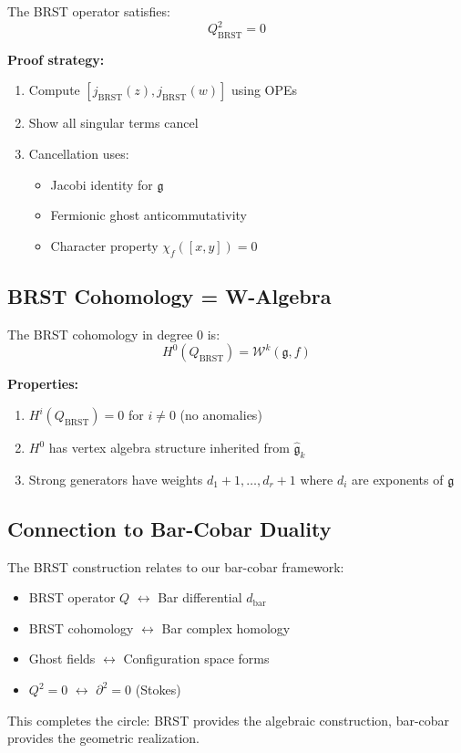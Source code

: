 \begin{theorem}[BRST Nilpotency: $Q^2 = 0$]
\label{thm:brst-nilpotency}
The BRST operator satisfies:
$$Q_{\text{BRST}}^2 = 0$$

\textbf{Proof strategy:}
\begin{enumerate}
\item Compute $[j_{\text{BRST}}(z), j_{\text{BRST}}(w)]$ using OPEs
\item Show all singular terms cancel
\item Cancellation uses:
\begin{itemize}
\item Jacobi identity for $\mathfrak{g}$
\item Fermionic ghost anticommutativity
\item Character property $\chi_f([x,y]) = 0$
\end{itemize}
\end{enumerate}
\end{theorem}

\subsection{BRST Cohomology = W-Algebra}

\begin{theorem}
\label{thm:brst-cohomology}
The BRST cohomology in degree 0 is:
$$H^0(Q_{\text{BRST}}) = \mathcal{W}^k(\mathfrak{g}, f)$$

\textbf{Properties:}
\begin{enumerate}
\item $H^i(Q_{\text{BRST}}) = 0$ for $i \neq 0$ (no anomalies)
\item $H^0$ has vertex algebra structure inherited from $\widehat{\mathfrak{g}}_k$
\item Strong generators have weights $d_1+1, \ldots, d_r+1$ where $d_i$ are 
exponents of $\mathfrak{g}$
\end{enumerate}
\end{theorem}

\subsection{Connection to Bar-Cobar Duality}

\begin{remark}
\label{rem:brst-bar-cobar}
The BRST construction relates to our bar-cobar framework:
\begin{itemize}
\item BRST operator $Q$ $\leftrightarrow$ Bar differential $d_{\text{bar}}$
\item BRST cohomology $\leftrightarrow$ Bar complex homology
\item Ghost fields $\leftrightarrow$ Configuration space forms
\item $Q^2 = 0$ $\leftrightarrow$ $\partial^2 = 0$ (Stokes)
\end{itemize}

This completes the circle: BRST provides the algebraic construction, bar-cobar 
provides the geometric realization.
\end{remark}

